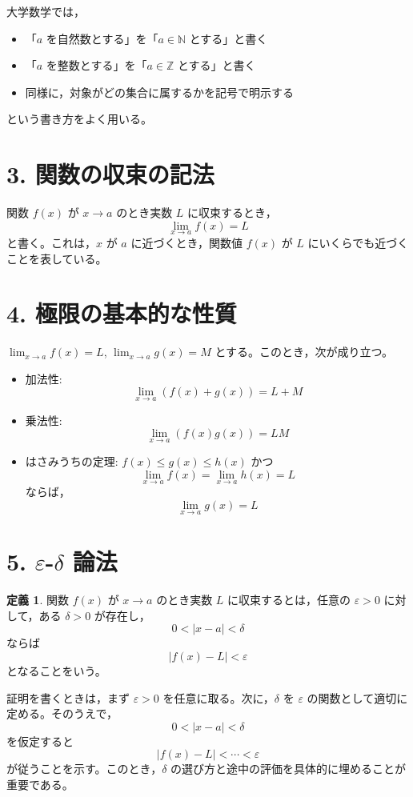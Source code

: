 \documentclass[a4paper,12pt]{jsarticle}
\theoremstyle{definition}
\newtheorem*{definition}{定義}
\begin{document}
大学数学では，
\begin{itemize}
\item 「$a$ を自然数とする」を「$a \in \mathbb{N}$ とする」と書く
\item 「$a$ を整数とする」を「$a \in \mathbb{Z}$ とする」と書く
\item 同様に，対象がどの集合に属するかを記号で明示する
\end{itemize}
という書き方をよく用いる。

\section*{3. 関数の収束の記法}

関数 $f(x)$ が $x \to a$ のとき実数 $L$ に収束するとき，
\[
\lim_{x \to a} f(x)=L
\]
と書く。これは，$x$ が $a$ に近づくとき，関数値 $f(x)$ が $L$ にいくらでも近づくことを表している。

\section*{4. 極限の基本的な性質}

$\lim_{x \to a} f(x)=L$, $\lim_{x \to a} g(x)=M$ とする。このとき，次が成り立つ。
\begin{itemize}
\item 加法性:
\[
\lim_{x \to a}(f(x)+g(x))=L+M
\]
\item 乗法性:
\[
\lim_{x \to a}(f(x)g(x))=LM
\]
\item はさみうちの定理: $f(x)\le g(x)\le h(x)$ かつ
\[
\lim_{x \to a} f(x)=\lim_{x \to a} h(x)=L
\]
ならば，
\[
\lim_{x \to a} g(x)=L
\]
\end{itemize}

\section*{5. $\varepsilon$-$\delta$ 論法}

\begin{definition}
関数 $f(x)$ が $x \to a$ のとき実数 $L$ に収束するとは，任意の $\varepsilon>0$ に対して，ある $\delta>0$ が存在し，
\[
0<|x-a|<\delta
\]
ならば
\[
|f(x)-L|<\varepsilon
\]
となることをいう。
\end{definition}

証明を書くときは，まず $\varepsilon>0$ を任意に取る。次に，$\delta$ を $\varepsilon$ の関数として適切に定める。そのうえで，
\[
0<|x-a|<\delta
\]
を仮定すると
\[
|f(x)-L|<\cdots<\varepsilon
\]
が従うことを示す。このとき，$\delta$ の選び方と途中の評価を具体的に埋めることが重要である。
\end{document}
